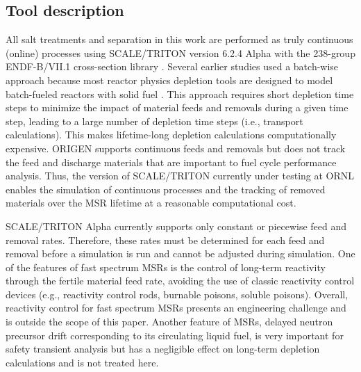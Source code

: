 \documentclass[letterpaper]{mandc2019}
\begin{document}
\subsection{Tool description}
All salt treatments and separation in this work are performed as truly continuous (online) processes using SCALE/TRITON version 6.2.4 Alpha \cite{betzler_implementation_2017-1} with the 238-group ENDF-B/VII.1 cross-section library \cite{rearden_scale_2016}. 
Several earlier studies used a batch-wise approach because most reactor physics depletion tools are designed to model batch-fueled reactors with solid fuel \cite{betzler_molten_2017,rykhlevskii_online_2017,rykhlevskii_modeling_2019}. 
This approach requires short depletion time steps to minimize the impact of material feeds and removals during a given time step, leading to a large number of depletion time steps (i.e., transport calculations). 
This makes lifetime-long depletion calculations computationally expensive. 
ORIGEN \cite{gauld_isotopic_2011} supports continuous feeds and removals but does not track the feed and discharge materials that are important to fuel cycle performance analysis. 
Thus, the version of SCALE/TRITON currently under testing at \gls{ORNL} enables the simulation of continuous processes and the tracking of removed materials over the \gls{MSR} lifetime at a reasonable computational cost. \par
SCALE/TRITON Alpha currently supports only constant or piecewise feed and removal rates. 
Therefore, these rates must be determined for each feed and removal before a simulation is run and cannot be adjusted during simulation. 
One of the features of fast spectrum \gls{MSR}s is the control of long-term reactivity through the fertile material feed rate, avoiding the use of classic reactivity control devices (e.g., reactivity control rods, burnable poisons, soluble poisons). 
Overall, reactivity control for fast spectrum \gls{MSR}s presents an engineering challenge and is outside the scope of this paper. 
Another feature of \gls{MSR}s, delayed neutron precursor drift corresponding to its circulating liquid fuel, is very important for safety transient analysis but has a negligible effect on long-term depletion calculations and is not treated here. 
\end{document}
